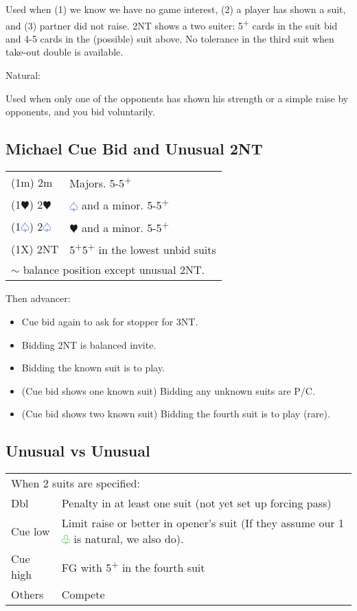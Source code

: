 \documentclass{article}
\renewcommand{\sp}{\textcolor{RoyalBlue}{$\varspade$}}
\newcommand{\he}{\textcolor{RubineRed}{$\varheart$}}
\newcommand{\cl}{\textcolor{LimeGreen}{$\varclub$}}
\newcommand{\nt}{\relsize{-1}NT\relsize{1}}
\newcommand{\up}{\textsuperscript{+}}
\begin{document}
	Used when (1) we know we have no game interest, (2) a player has shown a suit, and (3) partner did not raise. 2\nt{} shows a two suiter: 5\up{} cards in the suit bid and 4-5 cards in the (possible) suit above. No tolerance in the third suit when take-out double is available.
	
	\medskip

	Natural:

	Used when only one of the opponents has shown his strength or a simple raise by opponents, and you bid voluntarily.

\subsection{Michael Cue Bid and Unusual 2\nt{}}

\begin{tabular}{|l|p{6.5cm}}
	(1m) 2m & Majors. 5-5\up{} \\
	(1\he{}) 2\he{} & \sp{} and a minor. 5-5\up{} \\
	(1\sp{}) 2\sp{} & \he{} and a minor. 5-5\up{} \\
	(1X) 2\nt{} & 5\up{}5\up{} in the lowest unbid suits \\
	\multicolumn{2}{l}{$\sim$ balance position except unusual 2\nt{}.} \\
\end{tabular}

Then advancer:
\begin{itemize}
\itemsep0em
	\item Cue bid again to ask for stopper for 3\nt{}.
	\item Bidding 2\nt{} is balanced invite.
	\item Bidding the known suit is to play.
	\item (Cue bid shows one known suit) Bidding any unknown suits are P/C.
	\item (Cue bid shows two known suit) Bidding the fourth suit is to play (rare).
\end{itemize}

\subsection{Unusual vs Unusual}

\begin{tabular}{|l|p{6.5cm}}
	\multicolumn{2}{l}{When 2 suits are specified:} \\
    Dbl & Penalty in at least one suit (not yet set up forcing pass) \\
    Cue low & Limit raise or better in opener's suit (If they assume our 1\cl{} is natural, we also do). \\
    Cue high & FG with 5\up{} in the fourth suit \\
    Others & Compete \\
\end{tabular}
\end{document}
